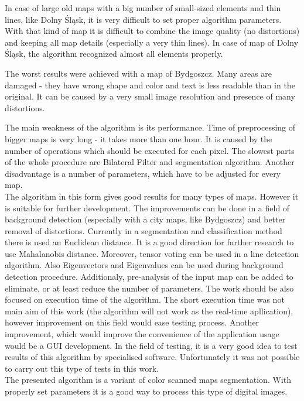 \documentclass[a4paper,onecolumn,oneside,12pt]{memoir}
\begin{document}
In case of large old maps with a big number of small-sized elements and thin lines, like Dolny 
Śląsk, it is very difficult to set proper algorithm parameters. With that kind of map it is
difficult to combine the image quality (no distortions) and keeping all map details (especially a very
thin lines). In case of map of Dolny Śląsk, the algorithm recognized almost all elements properly.

The worst results were achieved with a map of Bydgoszcz. Many areas are damaged - they have wrong
shape and color and text is less readable than in the original. It can be caused by a very small
image resolution and presence of many distortions.

The main weakness of the algorithm is its performance. Time of preprocessing of bigger maps is very
long - it takes more than one hour. It is caused by the number of operations which should be
executed for each pixel. The slowest parts of the whole procedure are Bilateral Filter and
segmentation algorithm. Another disadvantage is a number of parameters, which have to be adjusted
for every map.\\

The algorithm in this form gives good results for many types of maps. However it is suitable for
further development. The improvements can be done in a field of background detection (especially with
a city maps, like Bydgoszcz) and better removal of distortions. Currently in a segmentation and
classification method there is used an Euclidean distance.  It is a good direction for further
research to use Mahalanobis distance. Moreover, tensor voting can be used in a line detection
algorithm. Also Eigenvectors and Eigenvalues can be used during background detection procedure.
Additionaly, pre-analysis of the input map can be added to eliminate, or at least reduce
the number of parameters. The work should be also focused on execution time of the algorithm. The
short execution time was not main aim of this work (the algorithm will not work as the real-time
apllication), however improvement on this field would ease testing process. Another improvement,
which would improve the convenience of the application usage would be a GUI development.
In the field of testing, it is a very good idea to test results of this algorithm by specialised
software. Unfortunately it was not possible to carry out this type of tests in this work. \\

The presented algorithm is a variant of color scanned maps segmentation. With properly set
parameters it is a good way to process this type of digital images.
\end{document}
